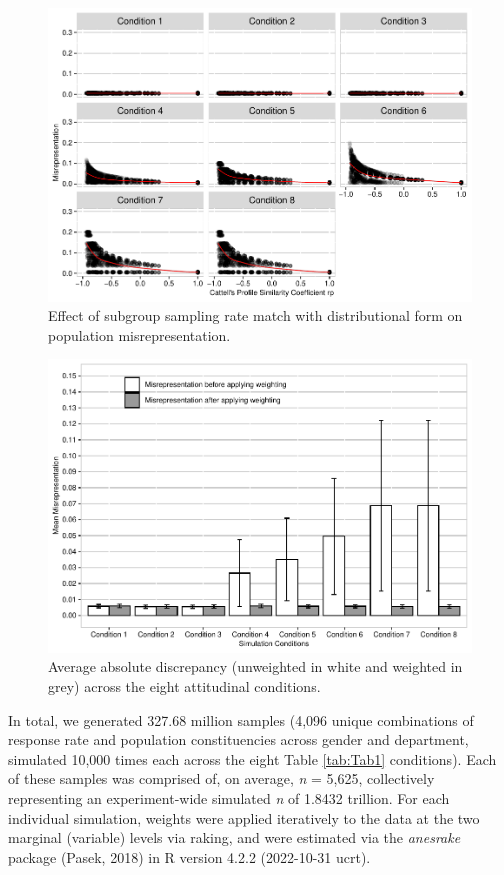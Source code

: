 \documentclass[
  man,mask]{apa7}
\begin{document}
\begin{figure}
\centering
\includegraphics{paper_files/figure-latex/Cattell3-1.pdf}
\caption{\label{fig:Cattell3}Effect of subgroup sampling rate match with distributional form on population misrepresentation.}
\end{figure}

\begin{figure}
\centering
\includegraphics{paper_files/figure-latex/Overall4-1.pdf}
\caption{\label{fig:Overall4}Average absolute discrepancy (unweighted in white and weighted in grey) across the eight attitudinal conditions.}
\end{figure}

In total, we generated 327.68 million samples (4,096 unique combinations of response rate and population constituencies across gender and department, simulated 10,000 times each across the eight Table \ref{tab:Tab1} conditions). Each of these samples was comprised of, on average, \emph{n} = 5,625, collectively representing an experiment-wide simulated \emph{n} of 1.8432 trillion. For each individual simulation, weights were applied iteratively to the data at the two marginal (variable) levels via raking, and were estimated via the \emph{anesrake} package (Pasek, 2018) in R version 4.2.2 (2022-10-31 ucrt).
\end{document}
